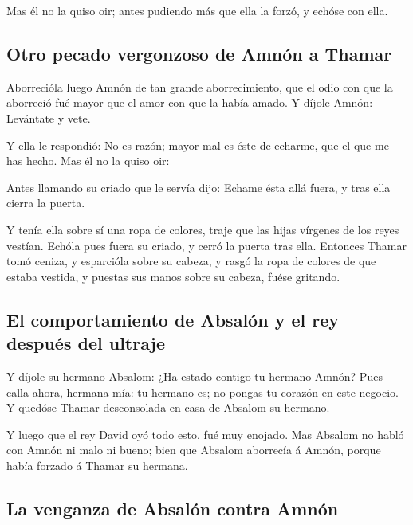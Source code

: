  Mas él no la quiso oir; antes pudiendo más que ella la
forzó, y echóse con ella.

\hypertarget{otro-pecado-vergonzoso-de-amnuxf3n-a-thamar}{%
\subsection{Otro pecado vergonzoso de Amnón a
Thamar}\label{otro-pecado-vergonzoso-de-amnuxf3n-a-thamar}}

 Aborrecióla luego Amnón de tan grande aborrecimiento,
que el odio con que la aborreció fué mayor que el amor con que la había
amado. Y díjole Amnón: Levántate y vete.

 Y ella le respondió: No es razón; mayor mal es éste de
echarme, que el que me has hecho. Mas él no la quiso oir:

 Antes llamando su criado que le servía dijo: Echame ésta
allá fuera, y tras ella cierra la puerta.

 Y tenía ella sobre sí una ropa de colores, traje que las
hijas vírgenes de los reyes vestían. Echóla pues fuera su criado, y
cerró la puerta tras ella.  Entonces Thamar tomó ceniza,
y esparcióla sobre su cabeza, y rasgó la ropa de colores de que estaba
vestida, y puestas sus manos sobre su cabeza, fuése gritando.

\hypertarget{el-comportamiento-de-absaluxf3n-y-el-rey-despuuxe9s-del-ultraje}{%
\subsection{El comportamiento de Absalón y el rey después del
ultraje}\label{el-comportamiento-de-absaluxf3n-y-el-rey-despuuxe9s-del-ultraje}}

 Y díjole su hermano Absalom: ¿Ha estado contigo tu
hermano Amnón? Pues calla ahora, hermana mía: tu hermano es; no pongas
tu corazón en este negocio. Y quedóse Thamar desconsolada en casa de
Absalom su hermano.

 Y luego que el rey David oyó todo esto, fué muy enojado.
 Mas Absalom no habló con Amnón ni malo ni bueno; bien
que Absalom aborrecía á Amnón, porque había forzado á Thamar su hermana.

\hypertarget{la-venganza-de-absaluxf3n-contra-amnuxf3n}{%
\subsection{La venganza de Absalón contra
Amnón}\label{la-venganza-de-absaluxf3n-contra-amnuxf3n}}

